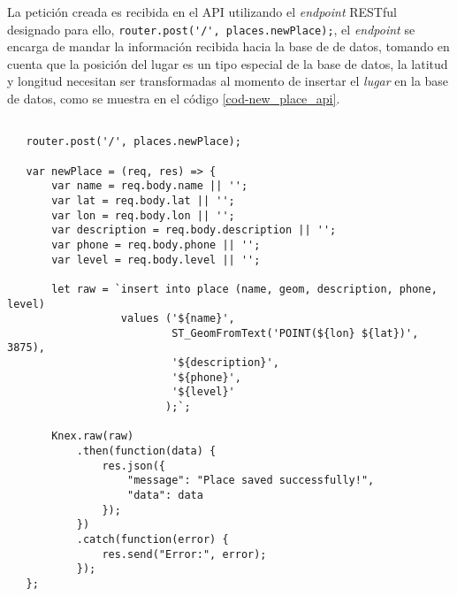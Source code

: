 La petición creada es recibida en el API utilizando el \emph{endpoint} RESTful designado para ello, \verb|router.post('/', places.newPlace);|, el \emph{endpoint} se encarga de mandar la información recibida hacia la base de de datos, tomando en cuenta que la posición del lugar es un tipo especial de la base de datos, la latitud y longitud necesitan ser transformadas al momento de insertar el \emph{lugar} en la base de datos, como se muestra en el código \ref{cod-new_place_api}.


\begin{center}
 \begin{lstlisting}[label=cod-new_place_api,caption=Insertar un ``lugar'' en la base de datos.]

   router.post('/', places.newPlace);

   var newPlace = (req, res) => {
       var name = req.body.name || '';
       var lat = req.body.lat || '';
       var lon = req.body.lon || '';
       var description = req.body.description || '';
       var phone = req.body.phone || '';
       var level = req.body.level || '';

       let raw = `insert into place (name, geom, description, phone, level)
                  values ('${name}',
                          ST_GeomFromText('POINT(${lon} ${lat})', 3875),
                          '${description}',
                          '${phone}',
                          '${level}'
                         );`;

       Knex.raw(raw)
           .then(function(data) {
               res.json({
                   "message": "Place saved successfully!",
                   "data": data
               });
           })
           .catch(function(error) {
               res.send("Error:", error);
           });
   };

 \end{lstlisting}
\end{center}






